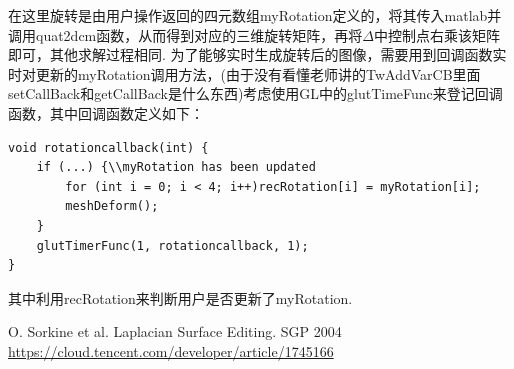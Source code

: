 \documentclass[12pt]{article}
\begin{document}
在这里旋转是由用户操作返回的四元数组myRotation定义的，将其传入matlab并调用quat2dcm函数，从而得到对应的三维旋转矩阵，再将$\Delta$中控制点右乘该矩阵即可，其他求解过程相同.
为了能够实时生成旋转后的图像，需要用到回调函数实时对更新的myRotation调用方法，(由于没有看懂老师讲的TwAddVarCB里面setCallBack和getCallBack是什么东西)考虑使用GL中的glutTimeFunc来登记回调函数，其中回调函数定义如下： 
\begin{lstlisting}
void rotationcallback(int) {
    if (...) {\\myRotation has been updated
        for (int i = 0; i < 4; i++)recRotation[i] = myRotation[i];
        meshDeform();
    }
    glutTimerFunc(1, rotationcallback, 1);
}
\end{lstlisting}
其中利用recRotation来判断用户是否更新了myRotation.




\begin{thebibliography}{3}
     O. Sorkine et al. Laplacian Surface Editing. SGP 2004
     \url{https://cloud.tencent.com/developer/article/1745166}

\end{thebibliography}
\end{document}
